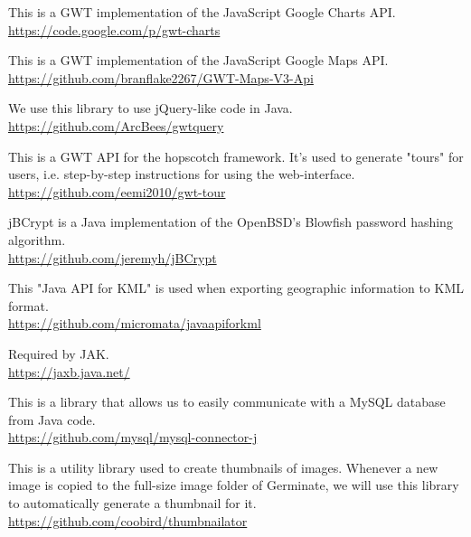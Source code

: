 \begin{description}[align=left,style=nextline,leftmargin=*,labelsep=\parindent,font=\bfseries]
	\item[GWT-Charts] This is a GWT implementation of the JavaScript Google Charts API. \\\url{https://code.google.com/p/gwt-charts}
	\item[GWT-Maps-V3-Api] This is a GWT implementation of the JavaScript Google Maps API. \\\url{https://github.com/branflake2267/GWT-Maps-V3-Api}
	\item[GwtQuery] We use this library to use jQuery-like code in Java. \\\url{https://github.com/ArcBees/gwtquery}
	\item[GWT-Tour] This is a GWT API for the hopscotch framework. It's used to generate "tours" for users, i.e. step-by-step instructions for using the web-interface. \\\url{https://github.com/eemi2010/gwt-tour}
	\item[jBCrypt] jBCrypt is a Java implementation of the OpenBSD's Blowfish password hashing algorithm. \\\url{https://github.com/jeremyh/jBCrypt}
	\item[JAK] This "Java API for KML" is used when exporting geographic information to KML format. \\\url{https://github.com/micromata/javaapiforkml}
	\item[JAXB] Required by JAK.\\\url{https://jaxb.java.net/}
	\item[MySQL Connector/J] This is a library that allows us to easily communicate with a MySQL database from Java code. \\\url{https://github.com/mysql/mysql-connector-j}
	\item[Thumbnailator] This is a utility library used to create thumbnails of images. Whenever a new image is copied to the full-size image folder of Germinate, we will use this library to automatically generate a thumbnail for it. \\\url{https://github.com/coobird/thumbnailator}
\end{description}